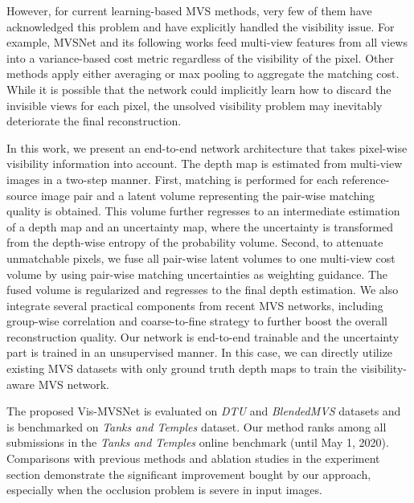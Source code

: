 \documentclass{bmvc2k}
\begin{document}
However, for current learning-based MVS methods, very few of them have acknowledged this problem and have explicitly handled the visibility issue. For example, MVSNet and its following works \cite{yao2018mvsnet,yao2019recurrent,chen2019point,gu2020cascade,cheng2020deep,yang2020cost} feed multi-view features from all views into a variance-based cost metric regardless of the visibility of the pixel. Other methods apply either averaging \cite{hartmann2017learned} or max pooling \cite{huang2018deepmvs} to aggregate the matching cost. While it is possible that the network could implicitly learn how to discard the invisible views for each pixel, the unsolved visibility problem may inevitably deteriorate the final reconstruction.

In this work, we present an end-to-end network architecture that takes pixel-wise visibility information into account. The depth map is estimated from multi-view images in a two-step manner.
First, matching is performed for each reference-source image pair and a latent volume representing the pair-wise matching quality is obtained. This volume further regresses to an intermediate estimation of a depth map and an uncertainty map, where the uncertainty is transformed from the depth-wise entropy of the probability volume. 
Second, to attenuate unmatchable pixels, we fuse all pair-wise latent volumes to one multi-view cost volume by using pair-wise matching uncertainties as weighting guidance. The fused volume is regularized and regresses to the final depth estimation. 
We also integrate several practical components from recent MVS networks, including group-wise correlation and \cite{guo2019group} coarse-to-fine strategy \cite{gu2020cascade} to further boost the overall reconstruction quality. 
Our network is end-to-end trainable and the uncertainty part is trained in an unsupervised manner. In this case, we can directly utilize existing MVS datasets with only ground truth depth maps to train the visibility-aware MVS network. 


The proposed Vis-MVSNet is evaluated on \textit{DTU} \cite{jensen2014large} and \textit{BlendedMVS} \cite{yao2020blendedmvs} datasets and is benchmarked on \textit{Tanks and Temples} \cite{knapitsch2017tanks} dataset. Our method ranks  among all submissions in the \textit{Tanks and Temples} online benchmark (until May 1, 2020). Comparisons with previous methods and ablation studies in the experiment section demonstrate the significant improvement bought by our approach, especially when the occlusion problem is severe in input images.
\end{document}
